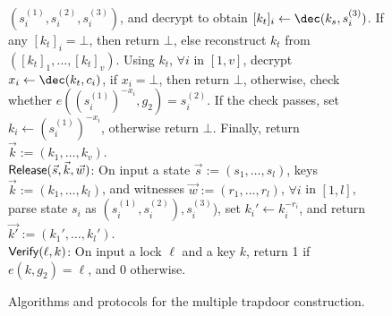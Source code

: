 \begin{figure*}[htb]
\begin{center}
{\begin{minipage}[t]{0.75\textwidth}
			$(s_i^{(1)}, s_i^{(2)}, s_i^{(3)})$, and decrypt to obtain $[k_t]_i \gets 
			\dec(k_s, s_i^{(3)})$. If any $[k_t]_i = \bot$, then return $\bot$, else reconstruct 
			$k_t$ from $([k_t]_1,\ldots,[k_t]_v)$. Using $k_t$, $\forall i$ in $[1,v]$, decrypt 
			$x_i \gets \dec(k_t, c_i)$, if $x_i = \bot$, then return $\bot$, otherwise, 
			check whether $e((s_i^{(1)})^{-x_i},g_2) = s_i^{(2)}$. If the check passes, set 
			$k_i \gets (s_i^{(1)})^{-x_i}$, otherwise return $\bot$. Finally, return $\vec{k} := 
			(k_1,\ldots,k_v)$. \\
			\underline{$\mathsf{Release}(\vec{s}, \vec{k}, \vec{w})$}: On input a state $\vec{s} := 
			(s_1,\ldots,s_l)$, keys $\vec{k} := (k_1,\ldots,k_l)$, and witnesses 
			$\vec{w} := (r_1,\ldots,r_l)$, $\forall i$ in $[1,l]$, parse state $s_i$ as 
			$(s_i^{(1)}, s_i^{(2)}), s_i^{(3)}$), set $k_i' \gets k_i^{-r_i}$, and return 
			$\vec{k'} := (k_1',\ldots,k_l')$. \\
			\underline{$\mathsf{Verify}(\ell, k)$}: On input a lock $\ell$ and a key $k$, return 1 
			if $e(k, g_2) = \ell$, and 0 otherwise.
		\end{minipage}
	}
	\end{center}
	
	\caption{Algorithms and protocols for the multiple trapdoor construction.}
	\label{fig:multi-trapdoor}
\end{figure*}
